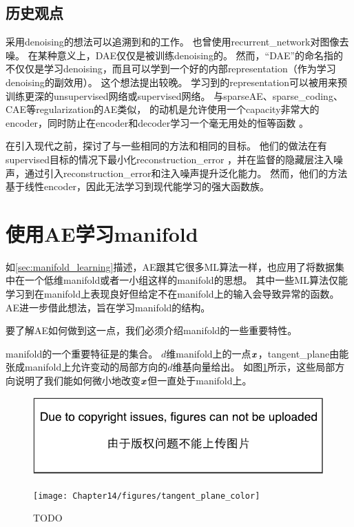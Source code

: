 \subsection{历史观点}
\label{sec:historical_perspective}
采用\gls{denoising}的想法可以追溯到\cite{Lecun-these87}和\citet{Gallinari87}的工作。
\citet{Behnke-2001}也曾使用\gls{recurrent_network}对图像去噪。
在某种意义上，\gls{DAE}仅仅是被训练\gls{denoising}的。
然而，``\gls{DAE}''的命名指的不仅仅是学习\gls{denoising}，而且可以学到一个好的内部\gls{representation}（作为学习\gls{denoising}的副效用）。
这个想法提出较晚\citep{VincentPLarochelleH2008-small,Vincent-JMLR-2010-small}。
学习到的\gls{representation}可以被用来预训练更深的\gls{unsupervised}网络或\gls{supervised}网络。
与\gls{sparse}\gls{AE}、\gls{sparse_coding}、\gls{CAE}等\gls{regularization}的\gls{AE}类似， 的动机是允许使用一个\gls{capacity}非常大的\gls{encoder}，同时防止在\gls{encoder}和\gls{decoder}学习一个毫无用处的恒等函数 。


在引入现代之前，\citet{Inayoshi-and-Kurita-2005}探讨了与一些相同的方法和相同的目标。
他们的做法在有\gls{supervised}目标的情况下最小化\gls{reconstruction_error} ，并在监督的隐藏层注入噪声，通过引入\gls{reconstruction_error}和注入噪声提升泛化能力。
然而，他们的方法基于线性\gls{encoder}，因此无法学习到现代能学习的强大函数族。



\section{使用\gls{AE}学习\gls{manifold}}
\label{sec:learning_manifolds_with_autoencoders}

如\ref{sec:manifold_learning}描述，\gls{AE}跟其它很多\gls{ML}算法一样，也应用了将数据集中在一个低维\gls{manifold}或者一小组这样的\gls{manifold}的思想。
其中一些\gls{ML}算法仅能学习到在\gls{manifold}上表现良好但给定不在\gls{manifold}上的输入会导致异常的函数。
\gls{AE}进一步借此想法，旨在学习\gls{manifold}的结构。


要了解\gls{AE}如何做到这一点，我们必须介绍\gls{manifold}的一些重要特性。


\gls{manifold}的一个重要特征是的集合。
$d$维\gls{manifold}上的一点$\boldsymbol{\mathit{x}}$，\gls{tangent_plane}由能张成\gls{manifold}上允许变动的局部方向的$d$维基向量给出。
如图\ref{fig:chap14_tangent_plane_color}所示，这些局部方向说明了我们能如何微小地改变$\boldsymbol{\mathit{x}}$但一直处于\gls{manifold}上。

\begin{figure}[!htb]
\ifOpenSource
\centerline{\includegraphics{figure.pdf}}
\else
\centerline{\texttt{[image: Chapter14/figures/tangent\_plane\_color]}}
\fi
\caption{TODO}
\label{fig:chap14_tangent_plane_color}
\end{figure}


